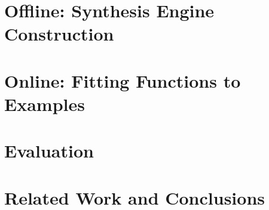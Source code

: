 \documentclass[pldi]{sigplanconf-pldi16}
\begin{document}
\section{Offline: Synthesis Engine Construction}


\section{Online: Fitting Functions to Examples} \label{synth}


\section{Evaluation}\label{evaluation}


\section{Related Work and Conclusions}\label{conclusions}




\end{document}
